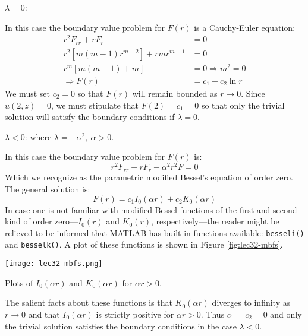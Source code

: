 \vspace{0.15cm}

\noindent\underline{$\lambda = 0$}:

\vspace{0.05cm}

\noindent In this case the boundary value problem for $F(r)$ is a Cauchy-Euler equation:
\begin{align*}
r^2F_{rr} + rF_r &= 0 \\
r^2[m(m-1)r^{m-2}] + rmr^{m-1} &= 0 \\
r^m[m(m-1) + m] &= 0 \Rightarrow m^2 = 0\\
\Rightarrow F(r) &= c_1 + c_2 \ln r
\end{align*}
We must set $c_2=0$ so that $F(r)$ will remain bounded as $r \to 0$.  Since $u(2,z)=0$, we must stipulate that $F(2)=c_1=0$ so that only the trivial solution will satisfy the boundary conditions if $\lambda = 0$.

\vspace{0.05cm}

\noindent\underline{$\lambda < 0$}: where $\lambda = -\alpha^2, \ \alpha>0$.

\noindent In this case the boundary value problem for $F(r)$ is:
\begin{equation*}
r^2F_{rr} + rF_r -\alpha^2r^2F = 0
\end{equation*} 
Which we recognize as the parametric modified Bessel's equation of order zero.  The general solution is:
\begin{equation*}
F(r) = c_1I_0(\alpha r) + c_2 K_0(\alpha r)
\end{equation*}
In case one is not familiar with modified Bessel functions of the first and second kind of order zero---$I_0(r)$ and $K_0(r)$, respectively---the reader might be relieved to be informed that MATLAB has built-in functions available: \lstinline[style=myMatlab]{besseli()} and \lstinline[style=myMatlab]{besselk()}. A plot of these functions is shown in Figure \ref{fig:lec32-mbfs}.
\begin{marginfigure}
\texttt{[image: lec32-mbfs.png]}
\caption{Plots of $I_0(\alpha r)$ and $K_0(\alpha r)$ for $\alpha r > 0$.}
\label{fig:lec32-mbfs}
\end{marginfigure}
The salient facts about these functions is that $K_0(\alpha r)$ diverges to infinity as $r \to 0$ and that $I_0(\alpha r)$ is strictly positive for $\alpha r > 0$.  Thus $c_1 = c_2 = 0$ and only the trivial solution satisfies the boundary conditions in the case $\lambda < 0 $.

